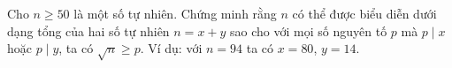 \ifshowproblem
\begin{problem}\label{example:IRN-2015-MO2-P6}
	Cho $n \ge 50$ là một số tự nhiên. Chứng minh rằng $n$ có thể được biểu diễn dưới dạng tổng của hai số tự nhiên $n = x + y$
	sao cho với mọi số nguyên tố $p$ mà $p \mid x$ hoặc $p \mid y$, ta có $\sqrt{n} \ge p$.  
	Ví dụ: với $n = 94$ ta có $x = 80$, $y = 14$.
\end{problem}
\fi

\footnotemark
{}
\fi